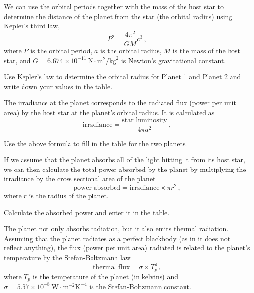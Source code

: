 We can use the orbital periods together with the mass of the host star to
determine the distance of the planet from the star (the orbital radius)
using Kepler’s third law,
\begin{equation}
 P^2 = \frac{4 \pi^2}{GM} a^3 \,,
\end{equation}
where $P$ is the orbital period, $a$ is the orbital radius, $M$ is the mass of
the host star, and $G = 6.674\times 10^{-11}\: \textrm{N} \cdot \textrm{m}^2 / \textrm{kg}^2$ is Newton’s gravitational
constant.

\begin{steps}
	\item Use Kepler's law to determine the orbital radius for Planet 1
and Planet 2 and write down your values in the table.
\end{steps}

The irradiance at the planet corresponds to the radiated flux (power per
unit area) by the host star at the planet’s orbital radius. It is calculated
as
\begin{equation}
\textrm{irradiance} = \frac{\textrm{star luminosity}}{4 \pi a^2} \,,
\end{equation}

\begin{steps}
\item Use the above formula to fill in the table
for the two planets.
\end{steps}

If we assume that the planet absorbs all of the light hitting it from its
host star, we can then calculate the total power absorbed by the planet
by multiplying the irradiance by the cross sectional area of the planet
\begin{equation}
 \textrm{power absorbed} = \textrm{irradiance} \times \pi r^2 \,,
\end{equation}
where $r$ is the radius of the planet.

\begin{steps}
	\item Calculate the absorbed power and
enter it in the table.
\end{steps}

The planet not only absorbs radiation, but it also emits thermal
radiation. Assuming that the planet radiates as a perfect blackbody (as in it does not reflect anything), the
flux (power per unit area) radiated is related to the planet's
temperature by the Stefan-Boltzmann law
\begin{equation}
 \textrm{thermal flux} = \sigma \times T_p^4 \,,
\end{equation}
where $T_p$ is the temperature of the planet (in kelvins) and $\sigma = 5.67 \times 10^{-8}\: \textrm{W} \cdot \textrm{m}^{-2} \textrm{K}^{-4}$ is the Stefan-Boltzmann constant.

